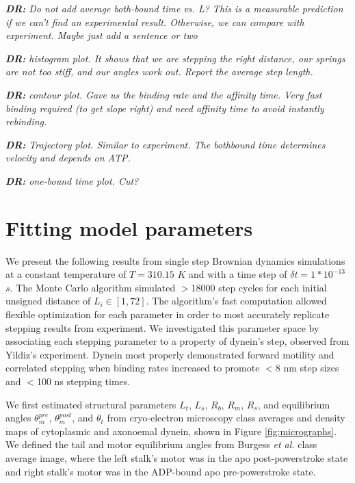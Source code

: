 \documentclass[9pt,twocolumn,twoside]{article}
\newcommand\davidsays[1]{{\em\color{blue} {\bf DR:} #1}}
\begin{document}
\davidsays{Do not add average both-bound time vs. L? This is a measurable prediction if we can't find an experimental result.  Otherwise, we can compare with experiment.  Maybe just add a sentence or two}

\davidsays{histogram plot.  It shows that we are stepping the right distance, our springs are not too stiff, and our angles work out.  Report the average step length.}

\davidsays{contour plot. Gave us the binding rate and the affinity time. Very fast binding required (to get slope right) and need affinity time to avoid instantly rebinding.}

\davidsays{Trajectory plot.  Similar to experiment. The bothbound time determines velocity and depends on ATP.}

\davidsays{one-bound time plot. Cut?}


\section*{Fitting model parameters}

We present the following results from single step Brownian dynamics simulations at a constant temperature of $T=310.15$ $K$ and with a time step of $\delta t =1 * 10^{-13}$ $s$. The Monte Carlo algorithm simulated $>$18000 step cycles for each initial unsigned distance of $L_i\in [1, 72]$. The algorithm's fast computation allowed flexible optimization for each parameter in order to most accurately replicate stepping results from experiment. We investigated this parameter space by associating each stepping parameter to a property of dynein's step, observed from Yildiz's experiment. Dynein most properly demonstrated forward motility and correlated stepping when binding rates increased to promote $<$8 nm step sizes and $<$100 ns stepping times. 

We first estimated structural parameters $L_t$, $L_s$, $R_b$, $R_m$, $R_s$, and equilibrium angles $\theta_{m}^{pre}$, $\theta_{m}^{post}$, and $\theta_{t}$ from cryo-electron microscopy class averages and density maps of cytoplasmic and axonoemal dynein, shown in Figure \ref{fig:micrographs}. We defined the tail and motor equilibrium angles from Burgess \textit{et al. } class average image, where the left stalk's motor was in the apo post-powerstroke state and right stalk's motor was in the ADP-bound apo pre-powerstroke state.  
\end{document}
